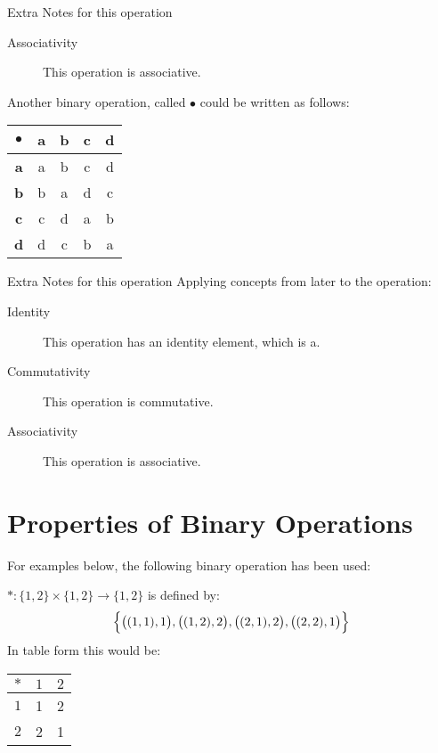 \documentclass[../notes.tex]{subfiles}
\begin{document}
\begin{example}
\begin{center}
\begin{sidenote}{Extra Notes for this operation}
\begin{description}
							\item[Associativity] This operation is associative.
						\end{description}
					\end{sidenote}
					\end{center}
					Another binary operation, called $\bullet$ could be written as follows:
					\begin{center}
						\begin{tabular}{|c|c c c c|}
							\hline
							\textbf{$\bullet$} & \textbf{a} & \textbf{b} & \textbf{c} & \textbf{d}\\
							\hline
							\textbf{a} & a & b & c & d \\
							\textbf{b} & b & a & d & c \\
							\textbf{c} & c & d & a & b \\
							\textbf{d} & d & c & b & a \\
							\hline
						\end{tabular}
					\end{center}
					\begin{sidenote}{Extra Notes for this operation}
						Applying concepts from later to the operation:
						\begin{description}
							\item[Identity] This operation has an identity element, which is a.
							\item[Commutativity] This operation is commutative.
							\item[Associativity] This operation is associative.
						\end{description}
					\end{sidenote}
				\end{example}
			\pagebreak
		\section{Properties of Binary Operations}
			For examples below, the following binary operation has been used:
			\begin{indentparagraph}
				$*: \{1, 2\} \times \{1, 2\} \rightarrow \{1, 2\}$ is defined by:
				\begin{align*}
					\Bigl\{\bigl((1, 1), 1\bigr), \bigl((1, 2), 2\bigr), \bigl((2, 1), 2\bigr), \bigl((2, 2), 1\bigr)\Bigr\}
				\end{align*}
				In table form this would be:
				\begin{center}
					\begin{tabular}{|c|c c|}
						\hline
						\textbf{$*$} & \textbf{$1$} & \textbf{$2$}\\
						\hline
						\textbf{$1$} & 1 & 2 \\
						\textbf{$2$} & 2 & 1 \\
						\hline
					\end{tabular}
				\end{center}
			\end{indentparagraph}
\end{document}
